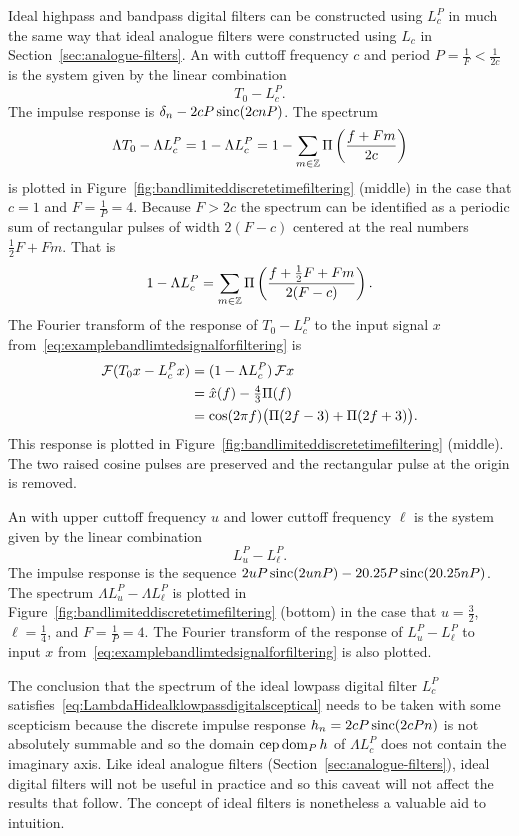 Ideal highpass and bandpass digital filters can be constructed using $L_c^P$ in much the same way that ideal analogue filters were constructed using $L_c$ in Section~\ref{sec:analogue-filters}.  An  with cuttoff frequency $c$ and period $P = \tfrac{1}{F} < \tfrac{1}{2c}$ is the system given by the linear combination 
\[
T_0 - L_c^{P}.
\]  
The impulse response is $\delta_n - 2cP\operatorname{sinc}(2cnP)$.  The spectrum 
\[
\Lambda T_0 - \Lambda L_c^P = 1 - \Lambda L_c^{P} = 1 - \sum_{m \in {\mathbb Z}} \Pi\left( \frac{f + Fm}{2c}\right)
\]
is plotted in Figure~\ref{fig:bandlimiteddiscretetimefiltering} (middle) in the case that $c = 1$ and $F = \tfrac{1}{P} = 4$.  Because $F > 2c$ the spectrum can be identified as a periodic sum of rectangular pulses of width $2(F-c)$ centered at the real numbers $\tfrac{1}{2}F + Fm$.  That is
\[
1 - \Lambda L_c^{P} = \sum_{m \in {\mathbb Z}} \Pi\left( \frac{f + \tfrac{1}{2}F + Fm}{2(F-c)}  \right).
\]  
The Fourier transform of the response of $T_0 - L_c^P$ to the input signal $x$ from~\eqref{eq:examplebandlimtedsignalforfiltering} is 
\begin{align*}
{\mathcal F}( T_0 x - L_c^P x ) &= (1 - \Lambda L_c^P) \, {\mathcal F} x \\
&= \hat{x}(f) - \tfrac{4}{3} \Pi(f) \\
& = \cos(2\pi f) \big( \Pi(2f - 3) + \Pi(2f + 3) \big).
\end{align*}
This response is plotted in Figure~\ref{fig:bandlimiteddiscretetimefiltering} (middle).  The two raised cosine pulses are preserved and the rectangular pulse at the origin is removed.  

An  with upper cuttoff frequency $u$ and lower cuttoff frequency $\ell$ is the system given by the linear combination 
\[
L_u^P - L_\ell^P.
\]  
The impulse response is the sequence $2uP\operatorname{sinc}(2unP) -  2 0.25 P\operatorname{sinc}(20.25 nP)$.  The spectrum $\Lambda L_u^P - \Lambda L_\ell^P$ is plotted in Figure~\ref{fig:bandlimiteddiscretetimefiltering} (bottom) in the case that $u = \tfrac{3}{2}$, $\ell = \tfrac{1}{4}$, and $F = \tfrac{1}{P} = 4$.  The Fourier transform of the response of $L_u^P - L_\ell^P$ to input $x$ from~\eqref{eq:examplebandlimtedsignalforfiltering} is also plotted.

The conclusion that the spectrum of the ideal lowpass digital filter $L_{c}^P$ satisfies~\eqref{eq:LambdaHidealklowpassdigitalsceptical} needs to be taken with some scepticism because the discrete impulse response $h_n = 2cP\operatorname{sinc}(2c P n)$ is not absolutely summable and so the domain $\operatorname{cep} \operatorname{dom}_P h$ of $\Lambda L_c^P$ does not contain the imaginary axis.  Like ideal analogue filters (Section~\ref{sec:analogue-filters}), ideal digital filters will not be useful in practice and so this caveat will not affect the results that follow. The concept of ideal filters is nonetheless a valuable aid to intuition.  

